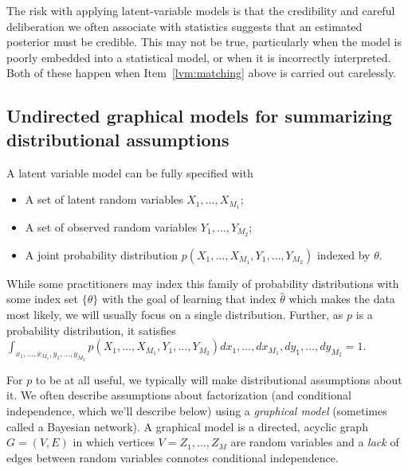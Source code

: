   The risk with applying latent-variable models is that the
  credibility and careful deliberation we often associate with
  statistics suggests that an estimated posterior must be
  credible.  This may not be true, particularly when the model is
  poorly embedded into a statistical model, or when it is incorrectly
  interpreted.  Both of these happen when Item~\ref{lvm:matching}
  above is carried out carelessly.

\subsection{Undirected graphical models for summarizing distributional assumptions}
A latent variable model can be fully specified with
\begin{itemize}
  \item A set of latent random variables $X_1, \ldots, X_{M_1}$;
  \item A set of observed random variables $Y_1, \ldots, Y_{M_2}$;
  \item A joint probability distribution $p(X_1, \ldots,
    X_{M_1}, Y_1, \ldots, Y_{M_2})$ indexed by $\theta$.
\end{itemize}
While some practitioners may index this family of probability
distributions with some index set $\{ \theta \}$ with the goal of
learning that index $\hat \theta$ which makes the data most likely, we
will usually focus on a single distribution.  Further, as $p$ is a
probability distribution, it satisfies $\int_{x_1, \ldots, x_{M_1},
  y_1, \ldots, y_{M_2}} p(X_1, \ldots, X_{M_1}, Y_1, \ldots, Y_{M_2})
d x_1, \ldots, d x_{M_1}, d y_1, \ldots, d y_{M_2} = 1$.

For $p$ to be at all useful, we typically will make distributional
assumptions about it.  We often describe assumptions about
factorization (and conditional independence, which we'll describe
below) using a \emph{graphical model} (sometimes called a Bayesian
network).  A graphical model is a directed, acyclic graph $G = (V, E)$
in which vertices $V=Z_1, \ldots, Z_M$ are random variables and a
\emph{lack} of edges between random variables connotes conditional
independence.


